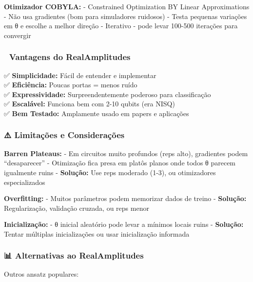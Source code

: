 \documentclass[
  brazilian,
]{report}
\begin{document}
\textbf{Otimizador COBYLA:} - Constrained Optimization BY Linear
Approximations - Não usa gradientes (bom para simuladores ruidosos) -
Testa pequenas variações em θ e escolhe a melhor direção - Iterativo -
pode levar 100-500 iterações para convergir

\subsubsection{🌟 Vantagens do
RealAmplitudes}\label{vantagens-do-realamplitudes}

✅ \textbf{Simplicidade:} Fácil de entender e implementar\\
✅ \textbf{Eficiência:} Poucas portas = menos ruído\\
✅ \textbf{Expressividade:} Surpreendentemente poderoso para
classificação\\
✅ \textbf{Escalável:} Funciona bem com 2-10 qubits (era NISQ)\\
✅ \textbf{Bem Testado:} Amplamente usado em papers e aplicações

\subsubsection{⚠️ Limitações e
Considerações}\label{limitauxe7uxf5es-e-considerauxe7uxf5es-1}

\textbf{Barren Plateaus:} - Em circuitos muito profundos (reps alto),
gradientes podem ``desaparecer'' - Otimização fica presa em platôs
planos onde todos θ parecem igualmente ruins - \textbf{Solução:} Use
reps moderado (1-3), ou otimizadores especializados

\textbf{Overfitting:} - Muitos parâmetros podem memorizar dados de
treino - \textbf{Solução:} Regularização, validação cruzada, ou reps
menor

\textbf{Inicialização:} - θ inicial aleatório pode levar a mínimos
locais ruins - \textbf{Solução:} Tentar múltiplas inicializações ou usar
inicialização informada

\subsubsection{📊 Alternativas ao
RealAmplitudes}\label{alternativas-ao-realamplitudes}

Outros ansatz populares:
\end{document}
